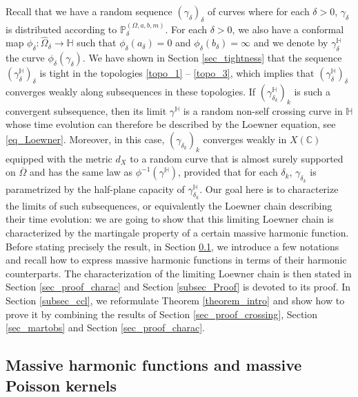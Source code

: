 \documentclass{article}
\newcommand{\PP}{{\mathbb{P}}}
\newcommand{\HH}{{\mathbb{H}}}
\theoremstyle{definition}
\theoremstyle{remark}
\theoremstyle{remark}
\begin{document}
Recall that we have a random sequence $(\gamma_{\delta})_{\delta}$ of curves where for each $\delta > 0$, $\gamma_{\delta}$ is distributed according to $\PP_{\delta}^{(\Omega,a,b,m)}$. For each $\delta >0$, we also have a conformal map $\phi_{\delta} \colon \hat \Omega_{\delta} \to \mathbb{H}$ such that $\phi_{\delta}(a_{\delta})=0$ and $\phi_{\delta}(b_{\delta})=\infty$ and we denote by $\gamma_{\delta}^{\HH}$ the curve $\phi_{\delta}(\gamma_{\delta})$. We have shown in Section \ref{sec_tightness} that the sequence $(\gamma_{\delta}^{\HH})_{\delta}$ is tight in the topologies \eqref{topo_1} -- \eqref{topo_3}, which implies that ${(\gamma_{\delta}^{\HH})}_{\delta}$ converges weakly along subsequences in these topologies. If $(\gamma_{\delta_k}^{\HH})_{k}$ is such a convergent subsequence, then its limit $\gamma^{\HH}$ is a random non-self crossing curve in $\HH$ whose time evolution can therefore be described by the Loewner equation, see \eqref{eq_Loewner}. Moreover, in this case, ${(\gamma_{\delta_k})}_k$ converges weakly in $X(\mathbb{C})$ equipped with the metric $d_X$ to a random curve that is almost surely supported on $\overline{\Omega}$ and has the same law as $\phi^{-1}(\gamma^{\HH})$, provided that for each $\delta_k$, $\gamma_{\delta_k}$ is parametrized by the half-plane capacity of $\gamma_{\delta_k}^{\HH}$. Our goal here is to characterize the limits of such subsequences, or equivalently the Loewner chain describing their time evolution: we are going to show that this limiting Loewner chain is characterized by the martingale property of a certain massive harmonic function. Before stating precisely the result, in Section \ref{sec_intro_Mharm}, we introduce a few notations and recall how to express massive harmonic functions in terms of their harmonic counterparts. The characterization of the limiting Loewner chain is then stated in Section \ref{sec_proof_charac} and Section \ref{subsec_Proof} is devoted to its proof. In Section \ref{subsec_ccl}, we reformulate Theorem \ref{theorem_intro} and show how to prove it by combining the results of Section \ref{sec_proof_crossing}, Section \ref{sec_martobs} and Section \ref{sec_proof_charac}.

\subsection{Massive harmonic functions and massive Poisson kernels} \label{sec_intro_Mharm}
\end{document}
